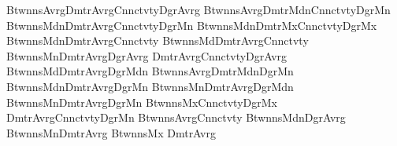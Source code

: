 BtwnnsAvrgDmtrAvrgCnnctvtyDgrAvrg 
BtwnnsAvrgDmtrMdnCnnctvtyDgrMn 
BtwnnsMdnDmtrAvrgCnnctvtyDgrMn 
BtwnnsMdnDmtrMxCnnctvtyDgrMx 
BtwnnsMdnDmtrAvrgCnnctvty 
BtwnnsMdDmtrAvrgCnnctvty 
BtwnnsMnDmtrAvrgDgrAvrg 
DmtrAvrgCnnctvtyDgrAvrg 
BtwnnsMdDmtrAvrgDgrMdn 
BtwnnsAvrgDmtrMdnDgrMn 
BtwnnsMdnDmtrAvrgDgrMn 
BtwnnsMnDmtrAvrgDgrMdn 
BtwnnsMnDmtrAvrgDgrMn 
BtwnnsMxCnnctvtyDgrMx 
DmtrAvrgCnnctvtyDgrMn 
BtwnnsAvrgCnnctvty 
BtwnnsMdnDgrAvrg 
BtwnnsMnDmtrAvrg 
BtwnnsMx 
DmtrAvrg 
